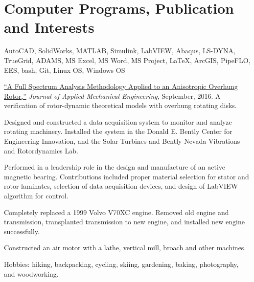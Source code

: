 \documentclass[10pt]{article} %
\begin{document}
\section{Computer Programs, Publication and Interests}
\begin{adjustwidth}{-7pt}{7pt}


	 \footnotesize{AutoCAD, SolidWorks, MATLAB, Simulink, LabVIEW, Abaqus, LS-DYNA, TrueGrid, ADAMS, MS Excel, MS Word, MS Project, {\fb \LaTeX}\setmainfont[SmallCapsFont=Fontin SmallCaps]{Fontin-Regular}, ArcGIS, PipeFLO, EES, bash, Git, Linux OS, Windows OS}\par
	 \footnotesize{ \href{https://www.omicsgroup.org/journals/a-full-spectrum-analysis-methodology-applied-to-an-anisotropic-overhung-rotor-2168-9873-1000232.php?aid=81544}{``A Full Spectrum Analysis Methodology Applied to an Anisotropic Overhung Rotor,''} \textit{Journal of Applied Mechanical Engineering}, September, 2016. A verification of rotor-dynamic theoretical models with overhung rotating disks.}\par
	 \footnotesize{Designed and constructed a data acquisition system to monitor and analyze rotating machinery. Installed the system in the Donald E. Bently Center for Engineering Innovation, and the Solar Turbines and Bently-Nevada Vibrations and Rotordynamics Lab.}\par
	 \footnotesize{Performed in a leadership role in the design and manufacture of an active magnetic bearing. Contributions included proper material selection for stator and rotor laminates, selection of data acquisition devices, and design of LabVIEW algorithm for control.}\par
	 \footnotesize{Completely replaced a 1999 Volvo V70XC engine. Removed old engine and transmission, transplanted transmission to new engine, and installed new engine successfully.}\par
	 \footnotesize{Constructed an air motor with a lathe, vertical mill, broach and other machines.}\par
	 \footnotesize{Hobbies: hiking, backpacking, cycling, skiing, gardening, baking, photography, and woodworking.}\par





\end{adjustwidth}
\end{document}
